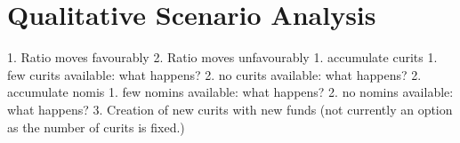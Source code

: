 
\section{Qualitative Scenario Analysis}

1. Ratio moves favourably
2. Ratio moves unfavourably
   1. accumulate curits
      1. few curits available: what happens?
      2. no curits available: what happens?
   2. accumulate nomis
      1. few nomins available: what happens?
      2. no nomins available: what happens?
3. Creation of new curits with new funds (not currently an option as the number of curits is fixed.)

\pagebreak